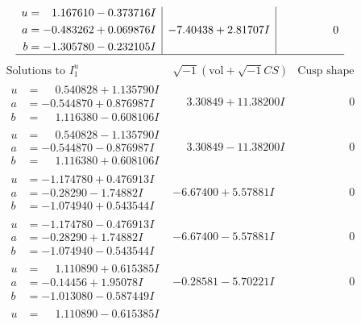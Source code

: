 \documentclass[1p]{elsarticle_modified}
\theoremstyle{definition}
\newcommand{\I}{\sqrt{-1}}
\begin{document}
$$\begin{array}{c|c|c}
\begin{aligned}
u &= \phantom{-}1.167610 - 0.373716 I \\
a &= -0.483262 + 0.069876 I \\
b &= -1.305780 - 0.232105 I\end{aligned}
 & -7.40438 + 2.81707 I & \phantom{-0.000000 } 0\\
 \hline 
 \end{array}$$\newpage$$\begin{array}{c|c|c}  
\text{Solutions to }I^u_{1}& \I (\text{vol} + \sqrt{-1}CS) & \text{Cusp shape}\\
 \hline 
\begin{aligned}
u &= \phantom{-}0.540828 + 1.135790 I \\
a &= -0.544870 + 0.876987 I \\
b &= \phantom{-}1.116380 - 0.608106 I\end{aligned}
 & \phantom{-}3.30849 + 11.38200 I & \phantom{-0.000000 } 0 \\ \hline\begin{aligned}
u &= \phantom{-}0.540828 - 1.135790 I \\
a &= -0.544870 - 0.876987 I \\
b &= \phantom{-}1.116380 + 0.608106 I\end{aligned}
 & \phantom{-}3.30849 - 11.38200 I & \phantom{-0.000000 } 0 \\ \hline\begin{aligned}
u &= -1.174780 + 0.476913 I \\
a &= -0.28290 - 1.74882 I \\
b &= -1.074940 + 0.543544 I\end{aligned}
 & -6.67400 + 5.57881 I & \phantom{-0.000000 } 0 \\ \hline\begin{aligned}
u &= -1.174780 - 0.476913 I \\
a &= -0.28290 + 1.74882 I \\
b &= -1.074940 - 0.543544 I\end{aligned}
 & -6.67400 - 5.57881 I & \phantom{-0.000000 } 0 \\ \hline\begin{aligned}
u &= \phantom{-}1.110890 + 0.615385 I \\
a &= -0.14456 + 1.95078 I \\
b &= -1.013080 - 0.587449 I\end{aligned}
 & -0.28581 - 5.70221 I & \phantom{-0.000000 } 0 \\ \hline\begin{aligned}
u &= \phantom{-}1.110890 - 0.615385 I \\

\end{aligned}
\end{array}$$
\end{document}
